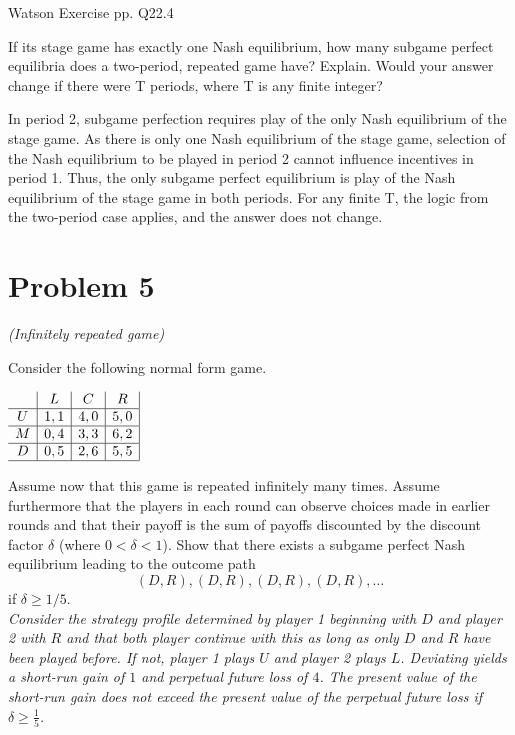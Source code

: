 \documentclass{article}
\begin{document}
Watson Exercise pp. Q22.4 

If its stage game has exactly one Nash equilibrium, how many subgame
perfect equilibria does a two-period, repeated game have? Explain. Would
your answer change if there were T periods, where T is any finite integer?



In period 2, subgame perfection requires play of the only Nash equilibrium
of the stage game. As there is only one Nash equilibrium of the stage game,
selection of the Nash equilibrium to be played in period 2 cannot influence
incentives in period 1. Thus, the only subgame perfect equilibrium is play
of the Nash equilibrium of the stage game in both periods. For any finite
T, the logic from the two-period case applies, and the answer does not
change.



\section{Problem 5} \textit{(Infinitely repeated game)}

Consider the following normal form game.

\begin{center}
$
\begin{array}{c|c|c|c|}
& L & C & R \\
\hline
U & 1,1 & 4,0 & 5,0 \\
\hline
M & 0,4 & 3,3 & 6,2 \\
\hline
D & 0,5 & 2,6 & 5,5 \\
\hline\end{array}
$
\end{center}

Assume now that this game is repeated infinitely many times. Assume furthermore that the players in each round can observe choices made in earlier rounds and that their payoff is the sum of payoffs discounted by the discount factor   $\delta$ (where $0 < \delta < 1$). Show that there exists a subgame perfect Nash equilibrium leading to the outcome path
$$(D, R), (D, R), (D, R), (D, R), \dots $$
if $\delta \geq 1/5$. \\ \textit{Consider the strategy profile determined by player 1 beginning with $D$ and player 2 with $R$ and that both player continue with this as long as only $D$ and $R$ have been played before. If not, player 1 plays $U$ and player 2 plays $L$. Deviating yields a short-run gain of $1$ and perpetual future loss of $4$. The present value of the short-run gain does not exceed the present value of the perpetual future loss if $\delta \geq \tfrac15$.}
\end{document}
